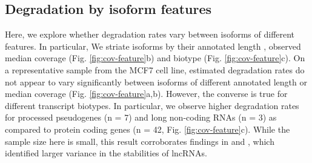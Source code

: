 \subsection{Degradation by isoform features}

Here, we explore whether degradation rates vary between isoforms of different features. In particular, We striate isoforms by their annotated length , observed median coverage (Fig. \ref{fig:cov-feature}b) and biotype (Fig. \ref{fig:cov-feature}c). On a representative sample from the MCF7 cell line, estimated degradation rates do not appear to vary significantly between isoforms of different annotated length or median coverage (Fig. \ref{fig:cov-feature}a,b). However, the converse is true for different transcript biotypes. In particular, we observe higher degradation rates for processed pseudogenes (n = 7) and long non-coding RNAs (n = 3) as compared to protein coding genes (n = 42, Fig. \ref{fig:cov-feature}c). While the sample size here is small, this result corroborates findings in \cite{Clark2012} and \cite{Kaiwan2021}, which identified larger variance in the stabilities of lncRNAs.   

